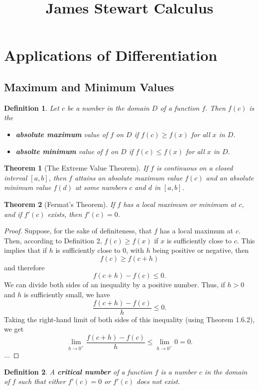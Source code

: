 \documentclass{article}
\title{James Stewart Calculus}
\author{}
\date{}
\newtheorem*{definition*}{Definition}
\newtheorem*{theorem*}{Theorem}
\begin{document}
\maketitle
\setcounter{section}{2}
\section{Applications of Differentiation}
\subsection{Maximum and Minimum Values}
\begin{definition*}
  Let $c$ be a number in the domain $D$ of a function $f$. Then $f(c)$ is the
  \begin{itemize}
    \item \textbf{absolute maximum} value of $f$ on $D$ if $f(c)\ge f(x)$ for all $x$ in $D$.
    \item \textbf{absolte minimum} value of $f$ on $D$ if $f(c)\le f(x)$ for all $x$ in $D$.
  \end{itemize}
\end{definition*}
\begin{theorem*}[The Extreme Value Theorem]
  If $f$ is continuous on a closed interval $[a, b]$, then $f$ attains an absolute maximum value
  $f(c)$ and an absolute minimum value $f(d)$ at some numbers $c$ and $d$ in $[a, b]$.
\end{theorem*}
\begin{theorem*}[Fermat's Theorem]
  If $f$ has a local maximum or minimum at $c$, and if $f'(c)$ exists, then $f'(c) = 0$.
\end{theorem*}
\begin{proof}
  Suppose, for the sake of definiteness, that $f$ has a local maximum at $c$. Then, according to
  Definition 2, $f(c)\ge f(x)$ if $x$ is sufficiently close to $c$. This implies that if $h$ is
  sufficiently close to 0, with $h$ being positive or negative, then
  \[f(c)\ge f(c+h)\]
  and therefore
  \[f(c+h)-f(c)\le0.\]
  We can divide both sides of an inequality by a positive number. Thus, if $h>0$ and $h$ is
  sufficiently small, we have
  \[\frac{f(c+h)-f(c)}{h}\le0.\]
  Taking the right-hand limit of both sides of this inequality (using Theorem 1.6.2), we get
  \[\lim_{h\to0^+}\frac{f(c+h)-f(c)}{h}\le\lim_{h\to0^+}0=0.\]
  $\ldots$
\end{proof}
\begin{definition*}
  A \textbf{critical number} of a function $f$ is a number $c$ in the domain of $f$ such that either
  $f'(c)=0$ or $f'(c)$ does not exist.
\end{definition*}
\end{document}
